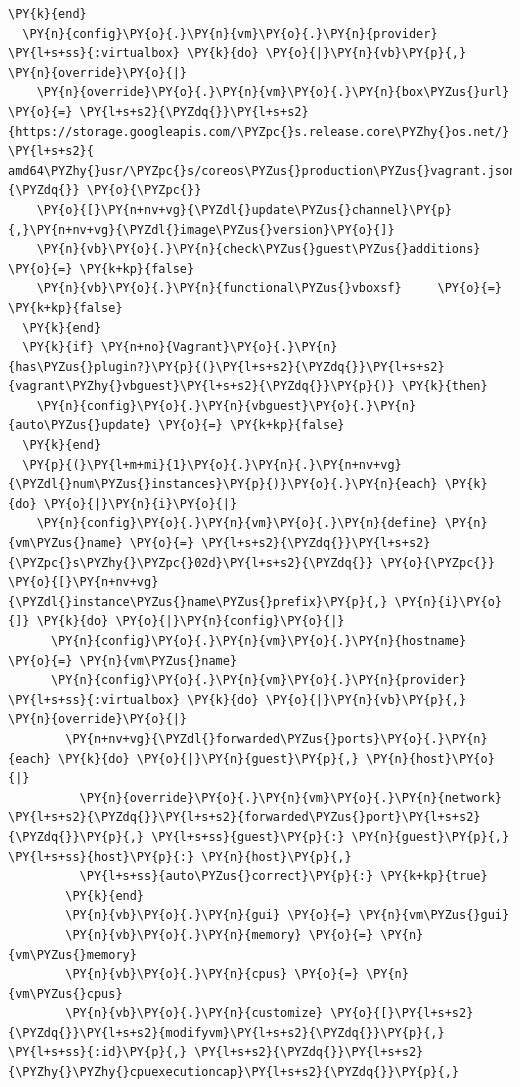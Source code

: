 \begin{codelisting}
\begin{Verbatim}[fontsize=\relsize{-2.5},fontseries=b,commandchars=\\\{\}]
  \PY{k}{end}
  \PY{n}{config}\PY{o}{.}\PY{n}{vm}\PY{o}{.}\PY{n}{provider} \PY{l+s+ss}{:virtualbox} \PY{k}{do} \PY{o}{|}\PY{n}{vb}\PY{p}{,} \PY{n}{override}\PY{o}{|}
    \PY{n}{override}\PY{o}{.}\PY{n}{vm}\PY{o}{.}\PY{n}{box\PYZus{}url} \PY{o}{=} \PY{l+s+s2}{\PYZdq{}}\PY{l+s+s2}{https://storage.googleapis.com/\PYZpc{}s.release.core\PYZhy{}os.net/}
\PY{l+s+s2}{    amd64\PYZhy{}usr/\PYZpc{}s/coreos\PYZus{}production\PYZus{}vagrant.json}\PY{l+s+s2}{\PYZdq{}} \PY{o}{\PYZpc{}}
    \PY{o}{[}\PY{n+nv+vg}{\PYZdl{}update\PYZus{}channel}\PY{p}{,}\PY{n+nv+vg}{\PYZdl{}image\PYZus{}version}\PY{o}{]}
    \PY{n}{vb}\PY{o}{.}\PY{n}{check\PYZus{}guest\PYZus{}additions} \PY{o}{=} \PY{k+kp}{false}
    \PY{n}{vb}\PY{o}{.}\PY{n}{functional\PYZus{}vboxsf}     \PY{o}{=} \PY{k+kp}{false}
  \PY{k}{end}
  \PY{k}{if} \PY{n+no}{Vagrant}\PY{o}{.}\PY{n}{has\PYZus{}plugin?}\PY{p}{(}\PY{l+s+s2}{\PYZdq{}}\PY{l+s+s2}{vagrant\PYZhy{}vbguest}\PY{l+s+s2}{\PYZdq{}}\PY{p}{)} \PY{k}{then}
    \PY{n}{config}\PY{o}{.}\PY{n}{vbguest}\PY{o}{.}\PY{n}{auto\PYZus{}update} \PY{o}{=} \PY{k+kp}{false}
  \PY{k}{end}
  \PY{p}{(}\PY{l+m+mi}{1}\PY{o}{.}\PY{n}{.}\PY{n+nv+vg}{\PYZdl{}num\PYZus{}instances}\PY{p}{)}\PY{o}{.}\PY{n}{each} \PY{k}{do} \PY{o}{|}\PY{n}{i}\PY{o}{|}
    \PY{n}{config}\PY{o}{.}\PY{n}{vm}\PY{o}{.}\PY{n}{define} \PY{n}{vm\PYZus{}name} \PY{o}{=} \PY{l+s+s2}{\PYZdq{}}\PY{l+s+s2}{\PYZpc{}s\PYZhy{}\PYZpc{}02d}\PY{l+s+s2}{\PYZdq{}} \PY{o}{\PYZpc{}} \PY{o}{[}\PY{n+nv+vg}{\PYZdl{}instance\PYZus{}name\PYZus{}prefix}\PY{p}{,} \PY{n}{i}\PY{o}{]} \PY{k}{do} \PY{o}{|}\PY{n}{config}\PY{o}{|}
      \PY{n}{config}\PY{o}{.}\PY{n}{vm}\PY{o}{.}\PY{n}{hostname} \PY{o}{=} \PY{n}{vm\PYZus{}name}
      \PY{n}{config}\PY{o}{.}\PY{n}{vm}\PY{o}{.}\PY{n}{provider} \PY{l+s+ss}{:virtualbox} \PY{k}{do} \PY{o}{|}\PY{n}{vb}\PY{p}{,} \PY{n}{override}\PY{o}{|}
        \PY{n+nv+vg}{\PYZdl{}forwarded\PYZus{}ports}\PY{o}{.}\PY{n}{each} \PY{k}{do} \PY{o}{|}\PY{n}{guest}\PY{p}{,} \PY{n}{host}\PY{o}{|}
          \PY{n}{override}\PY{o}{.}\PY{n}{vm}\PY{o}{.}\PY{n}{network} \PY{l+s+s2}{\PYZdq{}}\PY{l+s+s2}{forwarded\PYZus{}port}\PY{l+s+s2}{\PYZdq{}}\PY{p}{,} \PY{l+s+ss}{guest}\PY{p}{:} \PY{n}{guest}\PY{p}{,} \PY{l+s+ss}{host}\PY{p}{:} \PY{n}{host}\PY{p}{,} 
          \PY{l+s+ss}{auto\PYZus{}correct}\PY{p}{:} \PY{k+kp}{true}
        \PY{k}{end}
        \PY{n}{vb}\PY{o}{.}\PY{n}{gui} \PY{o}{=} \PY{n}{vm\PYZus{}gui}
        \PY{n}{vb}\PY{o}{.}\PY{n}{memory} \PY{o}{=} \PY{n}{vm\PYZus{}memory}
        \PY{n}{vb}\PY{o}{.}\PY{n}{cpus} \PY{o}{=} \PY{n}{vm\PYZus{}cpus}
        \PY{n}{vb}\PY{o}{.}\PY{n}{customize} \PY{o}{[}\PY{l+s+s2}{\PYZdq{}}\PY{l+s+s2}{modifyvm}\PY{l+s+s2}{\PYZdq{}}\PY{p}{,} \PY{l+s+ss}{:id}\PY{p}{,} \PY{l+s+s2}{\PYZdq{}}\PY{l+s+s2}{\PYZhy{}\PYZhy{}cpuexecutioncap}\PY{l+s+s2}{\PYZdq{}}\PY{p}{,} 

\end{Verbatim}
\end{codelisting}
